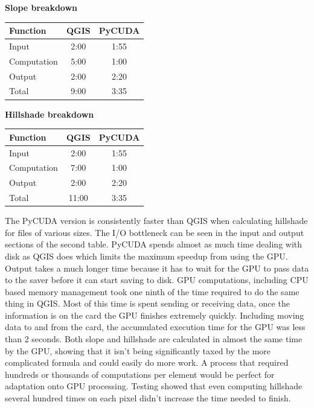 \documentclass[journal]{IEEEtran}
\begin{document}
\vspace{.25in}
\textbf{Slope breakdown}
\vspace{0.05in}

\begin{tabular}{ l | c | c }
    Function    & QGIS & PyCUDA\\ \hline
    Input       & 2:00 & 1:55\\ \hline
    Computation & 5:00 & 1:00\\ \hline
    Output      & 2:00 & 2:20\\ \hline
    Total       & 9:00 & 3:35
\end {tabular}

\vspace{.25in}
\textbf{Hillshade breakdown}
\vspace{0.05in}

\begin{tabular}{ l | c | c }
    Function    & QGIS & PyCUDA\\ \hline
    Input       & 2:00 & 1:55\\ \hline
    Computation & 7:00 & 1:00\\ \hline
    Output      & 2:00 & 2:20\\ \hline
    Total       & 11:00 & 3:35
\end {tabular}
\vspace{0.25in}

The PyCUDA version is consistently faster than QGIS when calculating hillshade
for files of various sizes. The I/O bottleneck  can be seen in the input and
output sections of the second table. PyCUDA spends almost as much time dealing
with disk as QGIS does which limits the maximum speedup from using the GPU.
Output takes a much longer time because it has to wait for the GPU to pass data
to the saver before it can start saving to disk.  GPU computations, including
CPU based memory management took one ninth of the time required to do the
same thing in QGIS. Most of this time is spent sending or receiving data, once
the information is on the card the GPU finishes extremely quickly. Including
moving data to and from the card, the accumulated execution time for the GPU
was less than 2 seconds.  Both slope and hillshade are calculated in almost the
same time by the GPU, showing that it isn't being significantly taxed by the
more complicated formula and could easily do more work.  A process that
required hundreds or thousands of computations per element would be perfect for
adaptation onto GPU processing. Testing showed that even computing hillshade
several hundred times on each pixel didn't increase the time needed to finish.
\end{document}
